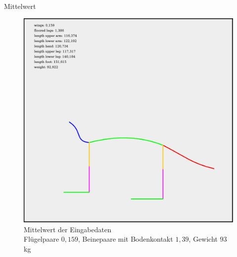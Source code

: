 \documentclass{beamer}
\begin{document}
\begin{frame}{Mittelwert}
 \captionsetup{justification=centering}
 \begin{figure}
  \centering
  \includegraphics[height=0.6\textheight]{../../PCA/mean_log_weight_downscaled_wings_legs_and_weight(onlyBox,stroke4).jpg}
  \caption{Mittelwert der Eingabedaten\\ Flügelpaare $0{,}159$, Beinepaare mit Bodenkontakt $1{,}39$, Gewicht $93$kg}
 \end{figure}
\end{frame}
\end{document}
